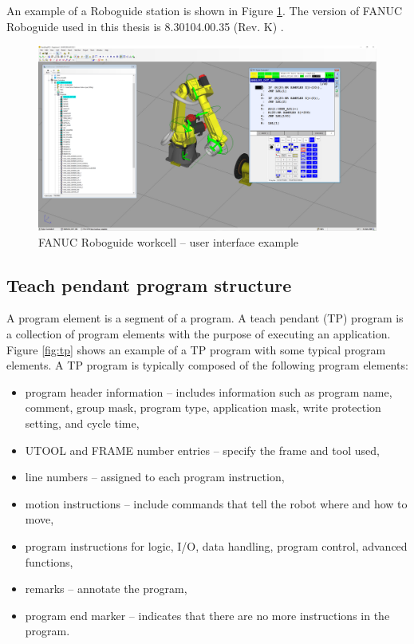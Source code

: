 An example of a Roboguide station is shown in Figure \ref{fig:roboguide}. The version of FANUC Roboguide used in this thesis is 8.30104.00.35 (Rev. K) \cite{roboguide}. 

\begin{figure}[h]
    \centering
    \includegraphics[width=0.9\linewidth]{img/roboguide.PNG}
    \caption{FANUC Roboguide workcell -- user interface example}
    \label{fig:roboguide}
\end{figure}

\subsection{Teach pendant program structure}

A program element is a segment of a program. A teach pendant (TP) program is a collection of program elements with the purpose of executing an application.  Figure \ref{fig:tp} shows an example of a TP program with some typical program elements. A TP program is typically composed of the following program elements:

\begin{itemize}

\item program header information -- includes information such as program name, comment, group mask, program type, application mask, write protection setting, and cycle time, 
\item UTOOL and FRAME number entries -- specify the frame and tool used,
\item line numbers -- assigned to each program instruction,
\item motion instructions -- include commands that tell the robot where and how to move,
\item program instructions for logic, I/O, data handling, program control, advanced functions,
\item remarks -- annotate the program,
\item program end marker -- indicates that there are no more instructions in the program.

\end{itemize}

